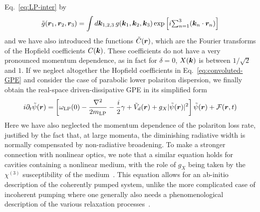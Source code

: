 Eq.~\eqref{eq:LP-inter} by
%
\begin{equation}\label{eq:convoluted-g}
  \tilde{g}(\bm{r}_1, \bm{r}_2, \bm{r}_3) = \int d\bm{k}_{1,2,3} \,g(\bm{k}_1,\bm{k}_2,\bm{k}_3) \exp \left[i \textstyle{\sum_{n=1}^3} (\bm{k}_n \cdot \bm{r}_n) \right]
\end{equation}
% 
and we have also introduced the functions $\tilde{C}(\bm{r})$, which are
the Fourier transforms of the Hopfield coefficients $C(\bm{k})$. These
coefficients do not have a very pronounced momentum dependence, as in
fact for $\delta = 0$, $X(\bm{k})$ is between $1/\sqrt{2}$ and $1$. If we
neglect altogether the Hopfield coefficients in
Eq.~\eqref{eq:convoluted-GPE} and consider the case of parabolic lower
polariton dispersion, we finally obtain the real-space
driven-dissipative GPE in its simplified form
%
\begin{equation}\label{eq:rspace-GPE}
  i \partial_t \tilde{\psi}(\bm{r}) = \left[ \omega_{\text{LP}}(0) - \frac{\nabla^2}{2m_{\text{LP}}} - \frac{i}{2}\gamma  + \tilde{V}_d(\bm{r}) + g_X \vert \tilde{\psi}(\bm{r}) \vert^2\right] \tilde{\psi}(\bm{r})
  + \mathcal{F}(\bm{r},t)
\end{equation}
% 
Here we have also neglected the momentum dependence of the polariton
loss rate, justified by the fact that, at large momenta, the
diminishing radiative width is normally compensated by non-radiative
broadening.  To make a stronger connection with nonlinear optics, we
note that a similar equation holds for cavities containing a nonlinear
medium, with the role of $g_X$ being taken by the $\chi^{(3)}$
susceptibility of the medium~\cite{boyd2003nonlinear}. This equation
allows for an ab-initio description of the coherently pumped system,
unlike the more complicated case of incoherent pumping where one
generally also needs a phenomenological description of the various
relaxation processes~\cite{Keeling_2007}.

